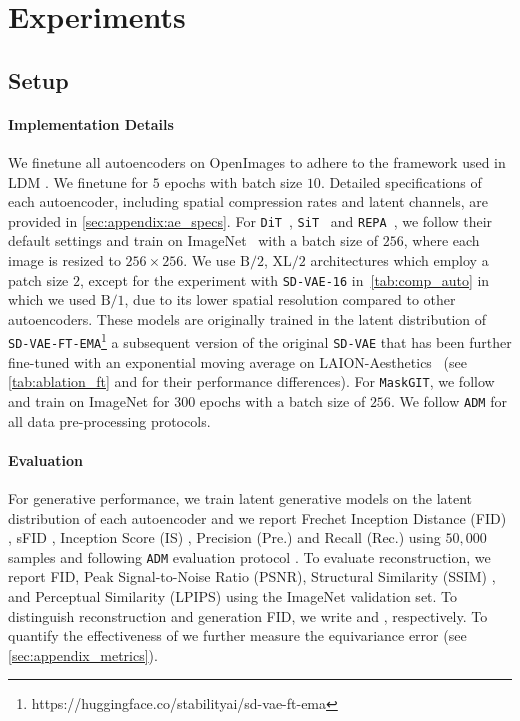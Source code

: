 \section{Experiments}
\label{sec:experiments}


\subsection{Setup}
\paragraph{Implementation Details}
We finetune all autoencoders on OpenImages to adhere to the framework used in LDM \cite{rombach2022high}. We finetune for $5$ epochs with batch size $10$.  Detailed specifications of each autoencoder, including spatial compression rates and latent channels, are provided in \autoref{sec:appendix:ae_specs}. 
For \texttt{DiT}~\cite{peebles2023scalable}, \texttt{SiT}~\cite{ma2024sit} and \texttt{REPA}~\cite{Yu2025repa}, we follow their default settings and train on ImageNet~\cite{deng2009imagenet} with a batch size of $256$, where each image is resized to $256\times 256$.
We use $\text{B/}2$, $\text{XL/}2$  architectures which employ a patch size $2$, except for the experiment with \texttt{SD-VAE-16} in~\autoref{tab:comp_auto} in which we used $\text{B/}1$, due to its lower spatial resolution compared to other autoencoders.
These models are originally trained in the latent distribution of \texttt{SD-VAE-FT-EMA}\footnote{https://huggingface.co/stabilityai/sd-vae-ft-ema} a subsequent version of the original \texttt{SD-VAE} that has been further fine-tuned with an exponential moving average on LAION-Aesthetics~\cite{schuhmann2022laion} (see \autoref{tab:ablation_ft} and \cite{peebles2023scalable} for their performance differences). 
For \texttt{MaskGIT}, we follow \cite{besnier2023pytorch} and train on ImageNet for 300 epochs with a batch size of $256$. 
We follow \texttt{ADM} \cite{dhariwal2021adm} for all data pre-processing protocols. 




\vspace{-5 pt}
\paragraph{Evaluation}
For generative performance, we train latent generative models on the latent distribution of each autoencoder and we report Frechet Inception Distance (FID) \cite{fid}, sFID \cite{sfid}, Inception Score (IS) \cite{is}, Precision (Pre.) and Recall (Rec.) \cite{kynkaanniemi2019improved} using $50,000$ samples and following \texttt{ADM} evaluation protocol \cite{dhariwal2021adm}. 
To evaluate reconstruction, we report FID, Peak Signal-to-Noise Ratio (PSNR), Structural Similarity (SSIM) \cite{ssim}, and Perceptual Similarity (LPIPS) \cite{zhang2018unreasonable} using the ImageNet validation set. 
To distinguish reconstruction and generation FID, we write  and , respectively. 
To quantify the effectiveness of
\our we further measure the equivariance error (see \autoref{sec:appendix_metrics}).

